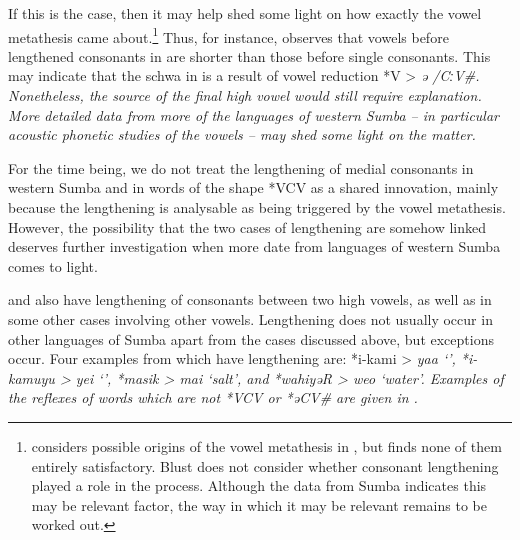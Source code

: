 If this is the case, then it may help shed some light
on how exactly the  vowel metathesis
came about.\footnote{
		\citet[220--229]{Blust2012a} considers possible
		origins of the vowel metathesis in ,
		but finds none of them entirely satisfactory.
		Blust does not consider whether consonant lengthening played a
		role in the process.
		Although the data from Sumba indicates this may be relevant factor,
		the way in which it may be relevant remains to be worked out.}
Thus, for instance, \citet[48]{Lovestrand2021} observes that
vowels before lengthened consonants in  are shorter than those before single consonants.
This may indicate that the schwa in  is a result
of vowel reduction *V\tsc{[+high]} > \it{ə} /{\gap}CːV{\#}.
Nonetheless, the source of the final high vowel would still require explanation.
More detailed data from more of the languages of western Sumba -- in
particular acoustic phonetic studies of the vowels -- may shed
some light on the matter.

For the time being, we do not treat the lengthening
of medial consonants in western Sumba and 
in words of the shape *V\tsc{[+high]}CV\tsc{[+low]} as
a shared innovation, mainly because the 
lengthening is analysable as being triggered by the vowel metathesis.
However, the possibility that the two cases of lengthening are
somehow linked deserves further investigation when more
date from languages of western Sumba comes to light.


 and  also have lengthening of consonants between two
high vowels, as well as in some other cases involving other vowels.
Lengthening does not usually occur in other languages of Sumba
apart from the cases discussed above, but exceptions occur.
Four examples from  which have lengthening are: *i-kami >
\it{yaa} ‘’, *i-kamuyu > \it{yei} ‘’,
*masik > \it{mai} ‘salt’,
and *wahiyəR > \it{weo} ‘water’.
Examples of the reflexes of words which are not *V\tsc{[+high]}CV\tsc{[+low]}{\#}
or *əCV{\#} are given in .
